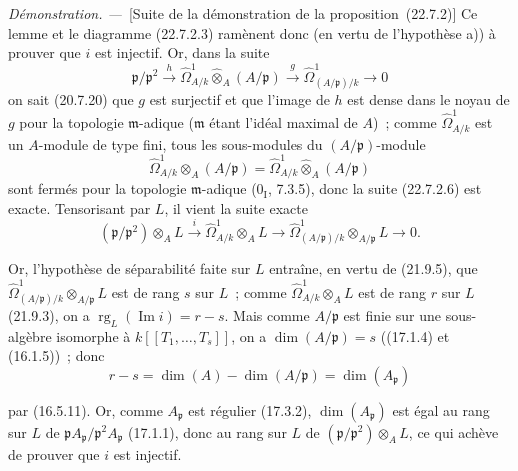 \documentclass[10pt,oneside]{book}
\newcommand{\oldpage}[2][]{%
  \setcounter{footnote}{0}%
  \marginpar{\scriptsize\textbf{#1}~|~#2}\ignorespaces}
\newenvironment{proof}{%
  \par\medskip\noindent\textit{Démonstration. ---\ }}{\par}
\begin{document}
\begin{proof}[Suite de la démonstration de la proposition~{\rm(22.7.2)}]
Ce lemme et le diagramme (22.7.2.3) ramènent donc (en vertu de l'hypothèse a))
à prouver que $i$ est injectif. Or, dans la suite
\begin{equation}
\label{0.22.7.2.6-fr}
  \mathfrak p/\mathfrak p^2\xrightarrow{h}
  \widehat\Omega^1_{A/k}\widehat\otimes_A(A/\mathfrak p)
  \xrightarrow{g}\widehat\Omega^1_{(A/\mathfrak p)/k}\longrightarrow0
  \tag{22.7.2.6}
\end{equation}
on sait (20.7.20) que $g$ est surjectif et que l'image de $h$ est dense dans
le noyau de $g$ pour la topologie $\mathfrak m$-adique ($\mathfrak m$ étant
l'idéal maximal de $A$)~; comme $\widehat\Omega^1_{A/k}$ est un $A$-module de
type fini, tous les sous-modules du $(A/\mathfrak p)$-module
\[
  \widehat\Omega^1_{A/k}\otimes_A(A/\mathfrak p)
  =\widehat\Omega^1_{A/k}\widehat\otimes_A(A/\mathfrak p)
\]
sont fermés pour la topologie $\mathfrak m$-adique ($0_{\mathrm I}$, 7.3.5),
donc la suite (22.7.2.6) est exacte. Tensorisant par $L$, il vient la suite
exacte
\[
  (\mathfrak p/\mathfrak p^2)\otimes_AL\xrightarrow{i}
  \widehat\Omega^1_{A/k}\otimes_AL\longrightarrow
  \widehat\Omega^1_{(A/\mathfrak p)/k}\otimes_{A/\mathfrak p}L
  \longrightarrow0.
\]

Or, l'hypothèse de séparabilité faite sur $L$ entraîne, en vertu de (21.9.5),
que $\widehat\Omega^1_{(A/\mathfrak p)/k}\otimes_{A/\mathfrak p}L$ est de
rang $s$ sur $L$~; comme $\widehat\Omega^1_{A/k}\otimes_AL$ est de rang $r$
sur $L$ (21.9.3), on a $\operatorname{rg}_L(\operatorname{Im}i)=r-s$. Mais comme
$A/\mathfrak p$ est finie sur une sous-algèbre isomorphe à
$k[[T_1,\ldots,T_s]]$, on a $\dim(A/\mathfrak p)=s$ ((17.1.4) et (16.1.5))~;
donc
\[
  r-s=\dim(A)-\dim(A/\mathfrak p)=\dim(A_{\mathfrak p})
\]

\oldpage[0\textsubscript{IV-1}]{211}

par (16.5.11). Or, comme $A_{\mathfrak p}$ est régulier (17.3.2),
$\dim(A_{\mathfrak p})$ est égal au rang sur $L$ de
$\mathfrak pA_{\mathfrak p}/\mathfrak p^2A_{\mathfrak p}$ (17.1.1), donc au
rang sur $L$ de $(\mathfrak p/\mathfrak p^2)\otimes_AL$, ce qui achève de
prouver que $i$ est injectif.
\end{proof}
\end{document}
